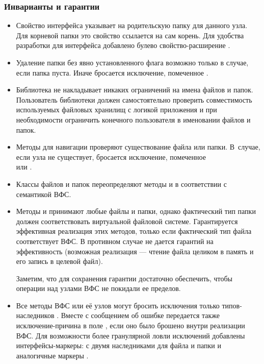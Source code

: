   \subsubsection{Инварианты и гарантии}
    \begin{itemize}
    \item Свойство  интерфейса  указывает на родительскую папку для данного узла. Для корневой папки это свойство ссылается на сам корень. Для удобства разработки для интерфейса  добавлено булево свойство-расширение .
    
    \item Удаление папки без явно установленного флага  возможно только в случае, если папка пуста. Иначе бросается исключение, помеченное .

    \item Библиотека не накладывает никаких ограничений на имена файлов и папок. Пользователь библиотеки должен самостоятельно проверить совместимость используемых файловых хранилищ с логикой приложения и при необходимости ограничить конечного пользователя в именовании файлов и папок.

    \item Методы для навигации проверяют существование файла или папки. В~случае, если узла не существует, бросается исключение, помеченное\\  или .

    \item Классы файлов и папок переопределяют методы  и  в соответствии с семантикой ВФС.

    \item Методы  и  принимают любые файлы и папки, однако фактический тип папки должен соответствовать виртуальной файловой системе. Гарантируется эффективная реализация этих методов, только если фактический тип файла соответствует ВФС. В противном случае не дается гарантий на эффективность (возможная реализация --- чтение файла целиком в память и его запись в целевой файл). 

    Заметим, что для сохранения гарантии достаточно обеспечить, чтобы операции над узлами ВФС не покидали ее пределов.

    \item Все методы ВФС или её узлов могут бросить исключения только типов-наследников . Вместе с сообщением об ошибке передается также исключение-причина в поле , если оно было брошено внутри реализации ВФС.
    Для возможности более гранулярной ловли исключений добавлены интерфейсы-маркеры:  с двумя наследниками для файла и папки и аналогичные маркеры .

    \end{itemize}

